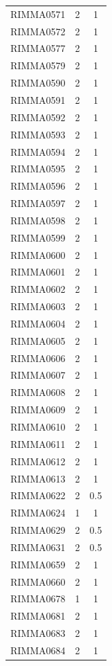 \documentclass[11pt]{article}
\newcounter{rowno}
\begin{document}
\begin{scriptsize}
\begin{longtable}{>{\stepcounter{rowno}}ccc}
    RIMMA0571 & 2     & 1 \\
    RIMMA0572 & 2     & 1 \\
    RIMMA0577 & 2     & 1 \\
    RIMMA0579 & 2     & 1 \\
    RIMMA0590 & 2     & 1 \\
    RIMMA0591 & 2     & 1 \\
    RIMMA0592 & 2     & 1 \\
    RIMMA0593 & 2     & 1 \\
    RIMMA0594 & 2     & 1 \\
    RIMMA0595 & 2     & 1 \\
    RIMMA0596 & 2     & 1 \\
    RIMMA0597 & 2     & 1 \\
    RIMMA0598 & 2     & 1 \\
    RIMMA0599 & 2     & 1 \\
    RIMMA0600 & 2     & 1 \\
    RIMMA0601 & 2     & 1 \\
    RIMMA0602 & 2     & 1 \\
    RIMMA0603 & 2     & 1 \\
    RIMMA0604 & 2     & 1 \\
    RIMMA0605 & 2     & 1 \\
    RIMMA0606 & 2     & 1 \\
    RIMMA0607 & 2     & 1 \\
    RIMMA0608 & 2     & 1 \\
    RIMMA0609 & 2     & 1 \\
    RIMMA0610 & 2     & 1 \\
    RIMMA0611 & 2     & 1 \\
    RIMMA0612 & 2     & 1 \\
    RIMMA0613 & 2     & 1 \\
    RIMMA0622 & 2     & 0.5 \\
    RIMMA0624 & 1     & 1 \\
    RIMMA0629 & 2     & 0.5 \\
    RIMMA0631 & 2     & 0.5 \\
    RIMMA0659 & 2     & 1 \\
    RIMMA0660 & 2     & 1 \\
    RIMMA0678 & 1     & 1 \\
    RIMMA0681 & 2     & 1 \\
    RIMMA0683 & 2     & 1 \\
    RIMMA0684 & 2     & 1 \\

\end{longtable}
\end{scriptsize}
\end{document}
